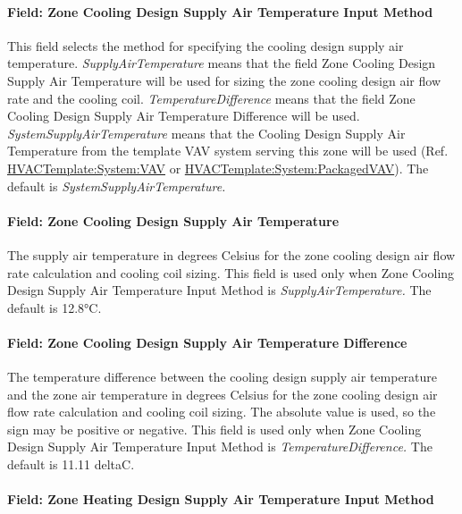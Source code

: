 \paragraph{Field: Zone Cooling Design Supply Air Temperature Input Method}\label{field-zone-cooling-design-supply-air-temperature-input-method-6}

This field selects the method for specifying the cooling design supply air temperature. \emph{SupplyAirTemperature} means that the field Zone Cooling Design Supply Air Temperature will be used for sizing the zone cooling design air flow rate and the cooling coil. \emph{TemperatureDifference} means that the field Zone Cooling Design Supply Air Temperature Difference will be used. \emph{SystemSupplyAirTemperature} means that the Cooling Design Supply Air Temperature from the template VAV system serving this zone will be used (Ref. \hyperref[hvactemplatesystemvav]{HVACTemplate:System:VAV} or \hyperref[hvactemplatesystempackagedvav]{HVACTemplate:System:PackagedVAV}). The default is \emph{SystemSupplyAirTemperature.}

\paragraph{Field: Zone Cooling Design Supply Air Temperature}\label{field-zone-cooling-design-supply-air-temperature-5}

The supply air temperature in degrees Celsius for the zone cooling design air flow rate calculation and cooling coil sizing. This field is used only when Zone Cooling Design Supply Air Temperature Input Method is \emph{SupplyAirTemperature.} The default is 12.8°C.

\paragraph{Field: Zone Cooling Design Supply Air Temperature Difference}\label{field-zone-cooling-design-supply-air-temperature-difference-6}

The temperature difference between the cooling design supply air temperature and the zone air temperature in degrees Celsius for the zone cooling design air flow rate calculation and cooling coil sizing. The absolute value is used, so the sign may be positive or negative. This field is used only when Zone Cooling Design Supply Air Temperature Input Method is \emph{TemperatureDifference.} The default is 11.11 deltaC.

\paragraph{Field: Zone Heating Design Supply Air Temperature Input Method}\label{field-zone-heating-design-supply-air-temperature-input-method-6}

